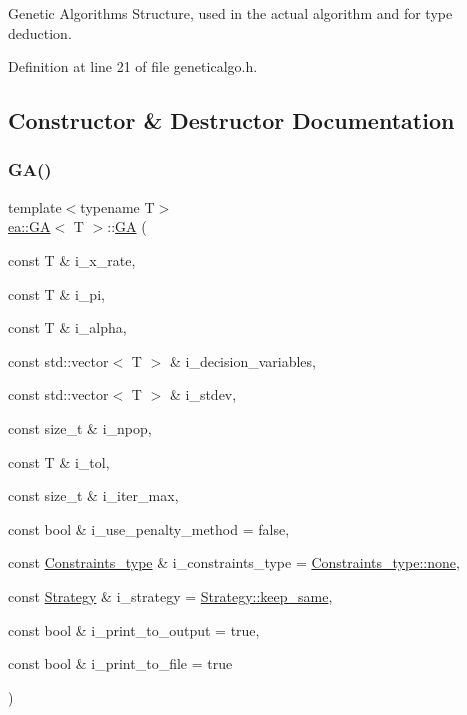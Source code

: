 Genetic Algorithms Structure, used in the actual algorithm and for type deduction. 

Definition at line 21 of file geneticalgo.\+h.



\subsection{Constructor \& Destructor Documentation}
\mbox{\label{structea_1_1_g_a_a5a8abc8d099a169a0c141079552be2c3}} 
\subsubsection{\texorpdfstring{G\+A()}{GA()}}
{\footnotesize\ttfamily template$<$typename T$>$ \\
\hyperlink{structea_1_1_g_a}{ea\+::\+GA}$<$ T $>$\+::\hyperlink{structea_1_1_g_a}{GA} (\begin{DoxyParamCaption}\item[{const T \&}]{i\+\_\+x\+\_\+rate,  }\item[{const T \&}]{i\+\_\+pi,  }\item[{const T \&}]{i\+\_\+alpha,  }\item[{const std\+::vector$<$ T $>$ \&}]{i\+\_\+decision\+\_\+variables,  }\item[{const std\+::vector$<$ T $>$ \&}]{i\+\_\+stdev,  }\item[{const size\+\_\+t \&}]{i\+\_\+npop,  }\item[{const T \&}]{i\+\_\+tol,  }\item[{const size\+\_\+t \&}]{i\+\_\+iter\+\_\+max,  }\item[{const bool \&}]{i\+\_\+use\+\_\+penalty\+\_\+method = {\ttfamily false},  }\item[{const \hyperlink{namespaceutilities_ab1a1517bf6e62a1acfab5293ca8985c1}{Constraints\+\_\+type} \&}]{i\+\_\+constraints\+\_\+type = {\ttfamily \hyperlink{namespaceea_a8e369877773b4db67b8512efdb4f8f89a334c4a4c42fdb79d7ebc3e73b517e6f8}{Constraints\+\_\+type\+::none}},  }\item[{const \hyperlink{namespaceea_a8e369877773b4db67b8512efdb4f8f89}{Strategy} \&}]{i\+\_\+strategy = {\ttfamily \hyperlink{namespaceea_a8e369877773b4db67b8512efdb4f8f89ac4a301043ce8554dfced7a0c0698bdad}{Strategy\+::keep\+\_\+same}},  }\item[{const bool \&}]{i\+\_\+print\+\_\+to\+\_\+output = {\ttfamily true},  }\item[{const bool \&}]{i\+\_\+print\+\_\+to\+\_\+file = {\ttfamily true} }\end{DoxyParamCaption})\hspace{0.3cm}{\ttfamily [inline]}}




